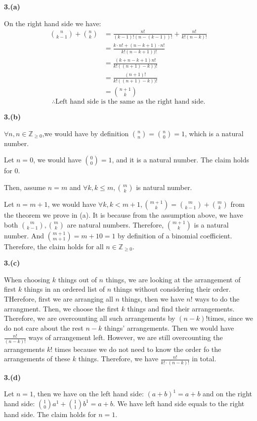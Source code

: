 \documentclass[a4paper,12pt]{report}
\begin{document}
\noindent
\textbf{3.(a)}

\noindent
On the right hand side we have:
\begin{align*}
\binom n{k-1}+\binom nk
&=\frac{n!}{(k-1)!(n-(k-1))!}+\frac{n!}{k!(n-k)!}\\
&=\frac{k\cdot{n!}+(n-k+1)\cdot{n!}}{k!(n-k+1))!}\\
&=\frac{(k+n-k+1)n!}{k!((n+1)-k))!}\\
&=\frac{(n+1)!}{k!((n+1)-k))!}\\
&=\binom {n+1}{k}
\end{align*}
\[\therefore \text{Left hand side is the same as the right hand side.}\]

\noindent
\textbf{3.(b)}

\noindent
$\forall n, n \in \mathbb{Z}_{\geq 0}$,we would have by definition \(\binom nn=\binom n0=1\), which is a natural number. 

\noindent
Let $n=0$, we would have \(\binom 00=1\), and it is a natural number. The claim holds for 0. 

\noindent
Then, assume $n=m$ and \(\forall k, k\leq m, \binom mk\) is natural number.

\noindent
Let $n=m+1$, we would have \(\forall k, k<m+1, \binom {m+1}k=\binom m{k-1}+\binom m{k}\) from the theorem we prove in (a). It is because from the assumption above, we have both \(\binom m{k-1},\binom m{k}\) are natural numbers. Therefore, \(\binom {m+1}k\) is a natural number. And \(\binom {m+1}{m+1}={m+1}0=1\) by definition of a binomial coefficient. Therefore, the claim holds for all $n \in \mathbb{Z}_{\geq 0}$.

\noindent
\textbf{3.(c)}

\noindent
When choosing $k$ things out of $n$ things, we are looking at the arrangement of first $k$ things in an ordered list of $n$ things without considering their order. THerefore, first we are arranging all $n$ things, then we have $n!$ ways to do the arrangment. Then, we choose the first $k$ things and find their arrangements. Therefore, we are overcounting all such arrangements by $(n-k)!$times, since we do not care about the rest $n-k$ things' arrangements. Then we would have $\frac{n!}{(n-k)!}$ ways of arrangement left. However, we are still overcounting the arrangements $k!$ times because we do not need to know the order fo the arrangements of these $k$ things. Therefore, we have $\frac{n!}{k!\cdot{(n-k)}!}$ in total.

\noindent
\textbf{3.(d)}

\noindent
Let $n=1$, then we have on the left hand side: $(a+b)^1=a+b$ and on the right hand side: \(\binom 10 a^1+\binom 11b^1=a+b\). We have left hand side equals to the right hand side. The claim holds for $n=1$. 
\end{document}
